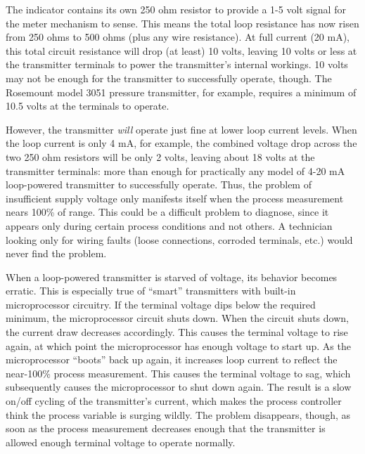 The indicator contains its own 250 ohm resistor to provide a 1-5 volt signal for the meter mechanism to sense.  This means the total loop resistance has now risen from 250 ohms to 500 ohms (plus any wire resistance).  At full current (20 mA), this total circuit resistance will drop (at least) 10 volts, leaving 10 volts or less at the transmitter terminals to power the transmitter's internal workings.  10 volts may not be enough for the transmitter to successfully operate, though.  The Rosemount model 3051 pressure transmitter, for example, requires a minimum of 10.5 volts at the terminals to operate. 

However, the transmitter \textit{will} operate just fine at lower loop current levels.  When the loop current is only 4 mA, for example, the combined voltage drop across the two 250 ohm resistors will be only 2 volts, leaving about 18 volts at the transmitter terminals: more than enough for practically any model of 4-20 mA loop-powered transmitter to successfully operate.  Thus, the problem of insufficient supply voltage only manifests itself when the process measurement nears 100\% of range.  This could be a difficult problem to diagnose, since it appears only during certain process conditions and not others.  A technician looking only for wiring faults (loose connections, corroded terminals, etc.) would never find the problem.

When a loop-powered transmitter is starved of voltage, its behavior becomes erratic.  This is especially true of ``smart'' transmitters with built-in microprocessor circuitry.  If the terminal voltage dips below the required minimum, the microprocessor circuit shuts down.  When the circuit shuts down, the current draw decreases accordingly.  This causes the terminal voltage to rise again, at which point the microprocessor has enough voltage to start up.  As the microprocessor ``boots'' back up again, it increases loop current to reflect the near-100\% process measurement.  This causes the terminal voltage to sag, which subsequently causes the microprocessor to shut down again.  The result is a slow on/off cycling of the transmitter's current, which makes the process controller think the process variable is surging wildly.  The problem disappears, though, as soon as the process measurement decreases enough that the transmitter is allowed enough terminal voltage to operate normally. 






